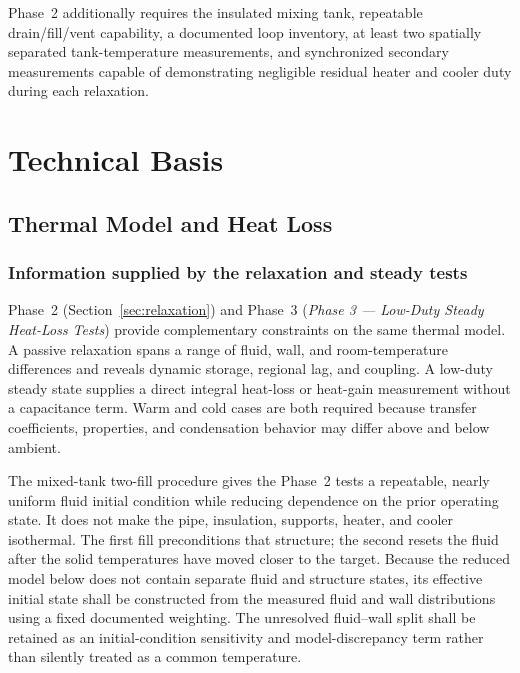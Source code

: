 \documentclass[11pt]{article}
\newcommand{\PhaseThreeDoc}{\textit{Phase 3 --- Low-Duty Steady Heat-Loss Tests}}
\begin{document}
Phase~2 additionally requires the insulated mixing tank, repeatable drain/fill/vent capability, a documented loop inventory, at least two spatially separated tank-temperature measurements, and synchronized secondary measurements capable of demonstrating negligible residual heater and cooler duty during each relaxation.

\clearpage
\section{Technical Basis}
\label{sec:technical_basis}
\subsection{Thermal Model and Heat Loss}

\subsubsection{Information supplied by the relaxation and steady tests}
\label{sec:relaxation_basis}

Phase~2 (Section~\ref{sec:relaxation}) and Phase~3 (\PhaseThreeDoc) provide complementary constraints on the same thermal model. A passive relaxation spans a range of fluid, wall, and room-temperature differences and reveals dynamic storage, regional lag, and coupling. A low-duty steady state supplies a direct integral heat-loss or heat-gain measurement without a capacitance term. Warm and cold cases are both required because transfer coefficients, properties, and condensation behavior may differ above and below ambient.

The mixed-tank two-fill procedure gives the Phase~2 tests a repeatable, nearly uniform fluid initial condition while reducing dependence on the prior operating state. It does not make the pipe, insulation, supports, heater, and cooler isothermal. The first fill preconditions that structure; the second resets the fluid after the solid temperatures have moved closer to the target. Because the reduced model below does not contain separate fluid and structure states, its effective initial state shall be constructed from the measured fluid and wall distributions using a fixed documented weighting. The unresolved fluid--wall split shall be retained as an initial-condition sensitivity and model-discrepancy term rather than silently treated as a common temperature.
\end{document}
